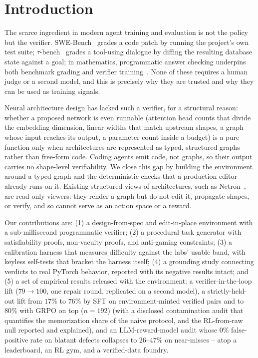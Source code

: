 \documentclass[11pt]{article}
\begin{document}
\section{Introduction}
The scarce ingredient in modern agent training and evaluation is not the policy but the verifier. SWE-Bench~\cite{swebench} grades a code patch by running the project's own test suite; $\tau$-bench~\cite{taubench} grades a tool-using dialogue by diffing the resulting database state against a goal; in mathematics, programmatic answer checking underpins both benchmark grading and verifier training~\cite{gsm8k}. None of these requires a human judge or a second model, and this is precisely why they are trusted and why they can be used as training signals.

Neural architecture design has lacked such a verifier, for a structural reason: whether a proposed network is even runnable (attention head counts that divide the embedding dimension, linear widths that match upstream shapes, a graph whose input reaches its output, a parameter count inside a budget) is a pure function only when architectures are represented as typed, structured graphs rather than free-form code. Coding agents emit code, not graphs, so their output carries no shape-level verifiability. We close this gap by building the environment around a typed graph and the deterministic checks that a production editor already runs on it. Existing structured views of architectures, such as Netron~\cite{netron}, are read-only viewers: they render a graph but do not edit it, propagate shapes, or verify, and so cannot serve as an action space or a reward.

Our contributions are: (1) a design-from-spec and edit-in-place environment with a sub-millisecond programmatic verifier; (2) a procedural task generator with satisfiability proofs, non-vacuity proofs, and anti-gaming constraints; (3) a calibration harness that measures difficulty against the labs' usable band, with keyless self-tests that bracket the harness itself; (4) a grounding study connecting verdicts to real PyTorch behavior, reported with its negative results intact; and (5) a set of empirical results released with the environment: a verifier-in-the-loop lift ($79\to100$, one repair round, replicated on a second model), a strictly-held-out lift from $17\%$ to $76\%$ by SFT on environment-minted verified pairs and to $80\%$ with GRPO on top ($n{=}192$) (with a disclosed contamination audit that quantifies the memorization share of the naive protocol, and the RL-from-raw null reported and explained), and an LLM-reward-model audit whose $0\%$ false-positive rate on blatant defects collapses to $26$--$47\%$ on near-misses -- atop a leaderboard, an RL gym, and a verified-data foundry.
\end{document}
